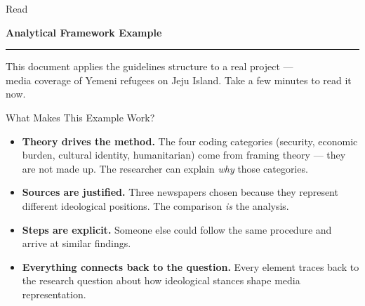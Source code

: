 \documentclass[aspectratio=169,11pt]{beamer}
\begin{document}
\begin{frame}
    \vspace{2.5cm}
    \begin{center}
        {\color{TextMuted}\large Read}
        \vspace{0.2cm}

        {\color{AccentBlue}\Large\bfseries Analytical Framework Example}
        \vspace{0.3cm}

        {\color{DustyRose}\rule{3cm}{0.8pt}}
        \vspace{0.5cm}

        {\color{TextMuted}\normalsize This document applies the guidelines structure to a real project ---\\media coverage of Yemeni refugees on Jeju Island. Take a few minutes to read it now.}
    \end{center}
\end{frame}

\begin{frame}{What Makes This Example Work?}
    \begin{itemize}
        \item \textbf{Theory drives the method.} The four coding categories (security, economic burden, cultural identity, humanitarian) come from framing theory --- they are not made up. The researcher can explain \textit{why} those categories.
        \vspace{0.3cm}
        \item \textbf{Sources are justified.} Three newspapers chosen because they represent different ideological positions. The comparison \textit{is} the analysis.
        \vspace{0.3cm}
        \item \textbf{Steps are explicit.} Someone else could follow the same procedure and arrive at similar findings.
        \vspace{0.3cm}
        \item \textbf{Everything connects back to the question.} Every element traces back to the research question about how ideological stances shape media representation.
    \end{itemize}
\end{frame}
\end{document}
